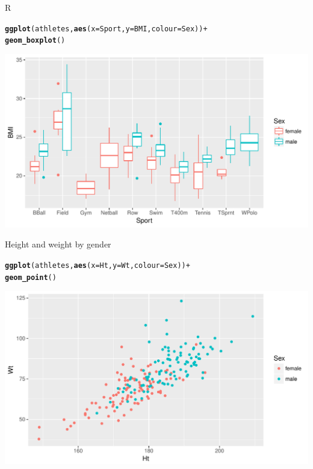 \documentclass[unknownkeysallowed]{beamer}\usepackage[]{graphicx}\usepackage[]{color}
\makeatletter
\def\maxwidth{ %
  \ifdim\Gin@nat@width>\linewidth
    \linewidth
  \else
    \Gin@nat@width
  \fi
}
\newcommand{\hlopt}[1]{\textcolor[rgb]{0,0,0}{#1}}%
\newcommand{\hlstd}[1]{\textcolor[rgb]{0.345,0.345,0.345}{#1}}%
\newcommand{\hlkwc}[1]{\textcolor[rgb]{0.333,0.667,0.333}{#1}}%
\newcommand{\hlkwd}[1]{\textcolor[rgb]{0.737,0.353,0.396}{\textbf{#1}}}%
\newenvironment{kframe}{%
 \def\at@end@of@kframe{}%
 \ifinner\ifhmode%
  \def\at@end@of@kframe{\end{minipage}}%
  \begin{minipage}{\columnwidth}%
 \fi\fi%
 \def\FrameCommand##1{\hskip\@totalleftmargin \hskip-\fboxsep
 \colorbox{shadecolor}{##1}\hskip-\fboxsep
     \hskip-\linewidth \hskip-\@totalleftmargin \hskip\columnwidth}%
 \MakeFramed {\advance\hsize-\width
   \@totalleftmargin\z@ \linewidth\hsize
   \@setminipage}}%
 {\par\unskip\endMakeFramed%
 \at@end@of@kframe}
\newenvironment{knitrout}{}{} %
\makeatother
\begin{document}
\begin{frame}[fragile]{R}
  
\begin{knitrout}
\color{fgcolor}\begin{kframe}
\begin{alltt}
\hlkwd{ggplot}\hlstd{(athletes,}\hlkwd{aes}\hlstd{(}\hlkwc{x}\hlstd{=Sport,}\hlkwc{y}\hlstd{=BMI,}\hlkwc{colour}\hlstd{=Sex))}\hlopt{+}
  \hlkwd{geom_boxplot}\hlstd{()}
\end{alltt}
\end{kframe}
\includegraphics[width=\maxwidth]{figure/unnamed-chunk-33-1} 

\end{knitrout}
  
\end{frame}

\begin{frame}[fragile]{Height and weight by gender}

\begin{knitrout}
\color{fgcolor}\begin{kframe}
\begin{alltt}
\hlkwd{ggplot}\hlstd{(athletes,}\hlkwd{aes}\hlstd{(}\hlkwc{x}\hlstd{=Ht,}\hlkwc{y}\hlstd{=Wt,}\hlkwc{colour}\hlstd{=Sex))}\hlopt{+}
  \hlkwd{geom_point}\hlstd{()}
\end{alltt}
\end{kframe}
\includegraphics[width=\maxwidth]{figure/unnamed-chunk-34-1} 

\end{knitrout}
  
\end{frame}
\end{document}
